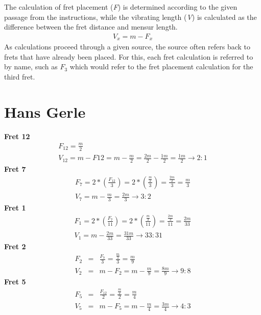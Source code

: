 The calculation of fret placement (\textit{F}) is determined according to the given
passage from the instructions, while the vibrating length (\textit{V}) is calculated as
the difference between the fret distance and mensur length.
\begin{eqnarray*}
    V_x = m - F_x
\end{eqnarray*}
As calculations proceed through a given source, the source often refers back to frets
that have already been placed.  For this, each fret calculation is referred to by name,
such as $F_{3}$ which would refer to the fret placement calculation for the third fret.

\section{Hans Gerle}
\textbf{Fret 12}
\begin{eqnarray*}
F_{12} =
    \frac{m}{2} \\
V_{12} =
    m - F{12} =
    m - \frac{m}{2} =
    \frac{2m}{2} - \frac{1m}{2} =
    \frac{1m}{2}
    \to 2:1
\end{eqnarray*}
\textbf{Fret 7}
\begin{eqnarray*}
F_{7} =
    2 * ( \frac{F_{12}}{3} ) =
    2 * ( \frac{\frac{m}{2}}{3} ) =
    \frac{\frac{2m}{2}}{3} =
    \frac{m}{3} \\
    V_{7} = m - \frac{m}{3} = \frac{2m}{3} \to 3:2
\end{eqnarray*}
\textbf{Fret 1}
\begin{eqnarray*}
F_{1} =
    2 * ( \frac{F_{7}}{11} ) =
    2 * ( \frac{\frac{m}{3}}{11} ) =
    \frac{\frac{2m}{3}}{11} =
    \frac{2m}{33} \\
V_{1} =
    m - \frac{2m}{33} =
    \frac{31m}{33}
    \to 33:31
\end{eqnarray*}
\textbf{Fret 2}
\begin{eqnarray*}
    F_{2}
        &=& \frac{F_{7}}{3}
        = \frac{\frac{m}{3}}{3}
        = \frac{m}{9} \\
    V_{2}
        &=& m - F_{2}
        = m - \frac{m}{9}
        = \frac{8m}{9}
        \to 9:8
\end{eqnarray*}
\textbf{Fret 5}
\begin{eqnarray*}\label{Gr-5}
    F_{5}
        &=& \frac{F_{12}}{2}
        = \frac{\frac{m}{2}}{2}
        = \frac{m}{4} \\
    V_{5}
        &=& m - F_{5}
        = m - \frac{m}{4}
        = \frac{3m}{4}
        \to 4:3
\end{eqnarray*}
